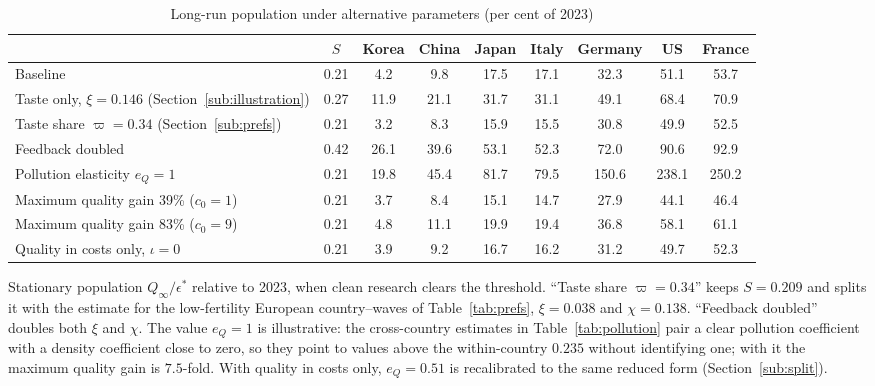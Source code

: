 \documentclass[11pt]{article}
\begin{document}
\begin{table}[h!]\centering
\begin{threeparttable}
\caption{Long-run population under alternative parameters (per cent of 2023)}
\label{tab:sens}
\footnotesize
\begin{tabular}{lcccccccc}
\toprule
 & $S$ & Korea & China & Japan & Italy & Germany & US & France\\
\midrule
Baseline                                & 0.21 & 4.2 & 9.8 & 17.5 & 17.1 & 32.3 & 51.1 & 53.7\\
Taste only, $\xi=0.146$ (Section~\ref{sub:illustration}) & 0.27 & 11.9 & 21.1 & 31.7 & 31.1 & 49.1 & 68.4 & 70.9\\
Taste share $\varpi=0.34$ (Section~\ref{sub:prefs}) & 0.21 & 3.2 & 8.3 & 15.9 & 15.5 & 30.8 & 49.9 & 52.5\\
Feedback doubled                        & 0.42 & 26.1 & 39.6 & 53.1 & 52.3 & 72.0 & 90.6 & 92.9\\
Pollution elasticity $e_Q=1$            & 0.21 & 19.8 & 45.4 & 81.7 & 79.5 & 150.6 & 238.1 & 250.2\\
Maximum quality gain 39\% ($c_0=1$)     & 0.21 & 3.7 & 8.4 & 15.1 & 14.7 & 27.9 & 44.1 & 46.4\\
Maximum quality gain 83\% ($c_0=9$)     & 0.21 & 4.8 & 11.1 & 19.9 & 19.4 & 36.8 & 58.1 & 61.1\\
Quality in costs only, $\iota=0$         & 0.21 & 3.9 & 9.2 & 16.7 & 16.2 & 31.2 & 49.7 & 52.3\\
\bottomrule
\end{tabular}
\begin{tablenotes}\footnotesize
\item Stationary population $Q_\infty/\epsilon^\ast$ relative to 2023, when clean research clears the
threshold. ``Taste share $\varpi=0.34$'' keeps $S=0.209$ and splits it with the estimate for the
low-fertility European country--waves of Table~\ref{tab:prefs}, $\xi=0.038$ and $\chi=0.138$. ``Feedback doubled''
doubles both $\xi$ and $\chi$. The value $e_Q=1$ is illustrative: the cross-country estimates in Table~\ref{tab:pollution} pair a
clear pollution coefficient with a density coefficient close to zero, so they point to values above the
within-country $0.235$ without identifying one; with it the
maximum quality gain is $7.5$-fold. With quality in costs only, $e_Q=0.51$ is recalibrated to the same
reduced form (Section~\ref{sub:split}).
\end{tablenotes}
\end{threeparttable}
\end{table}
\end{document}
